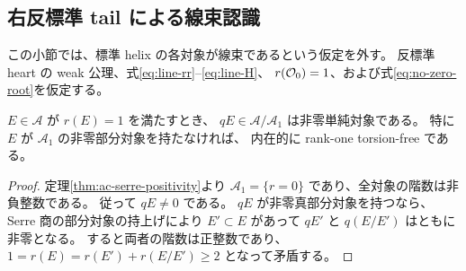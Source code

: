 \subsection{右反標準 tail による線束認識}

この小節では、標準 helix の各対象が線束であるという仮定を外す。
反標準 heart の weak 公理、式\eqref{eq:line-rr}--\eqref{eq:line-H}、
$r(\mathcal O_0)=1$、および式\eqref{eq:no-zero-root}を仮定する。

\begin{lemma}
\label{lem:numerical-rank-one-generic-simple}
$E\in\mathcal A$ が $r(E)=1$ を満たすとき、
$qE\in\mathcal A/\mathcal A_1$ は非零単純対象である。
特に $E$ が $\mathcal A_1$ の非零部分対象を持たなければ、
内在的に rank-one torsion-free である。
\end{lemma}
\begin{proof}
定理\ref{thm:ac-serre-positivity}より
$\mathcal A_1=\{r=0\}$ であり、全対象の階数は非負整数である。
従って $qE\ne0$ である。
$qE$ が非零真部分対象を持つなら、Serre 商の部分対象の持上げにより
$E'\subset E$ があって $qE'$ と $q(E/E')$ はともに非零となる。
すると両者の階数は正整数であり、
$1=r(E)=r(E')+r(E/E')\ge2$ となって矛盾する。
\end{proof}

